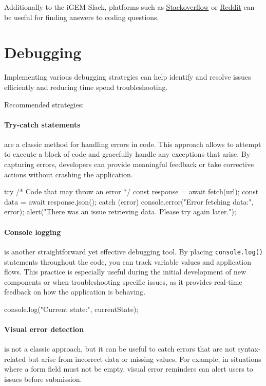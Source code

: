 
Additionally to the iGEM Slack, platforms such as \href{https://stackoverflow.com/}{Stackoverflow} or \href{https://www.reddit.com/}{Reddit} can be useful for finding answers to coding questions.


\section{Debugging}\label{sec:debugging}
Implementing various debugging strategies can help identify and resolve issues efficiently and reducing time spend
troubleshooting.

Recommended strategies:

\paragraph{Try-catch statements} are a classic method for handling errors in code.
This approach allows to attempt to execute a block of code and gracefully handle any exceptions that arise.
By capturing errors, developers can provide meaningful feedback or take corrective actions without crashing the application.
\begin{mytsbox}
    try {
            {/* Code that may throw an error */}
        const response = await fetch(url);
        const data = await response.json();
    } catch (error) {
        console.error("Error fetching data:", error);
        alert("There was an issue retrieving data.
        Please try again later.");
    }
\end{mytsbox}

\paragraph{Console logging} is another straightforward yet effective debugging tool.
By placing \texttt{console.log()} statements throughout the code, you can track variable values and
application flows.
This practice is especially useful during the initial development of new components or when troubleshooting
specific issues, as it provides real-time feedback on how the application is behaving.
\begin{mytsbox}
    console.log("Current state:", currentState);
\end{mytsbox}

\paragraph{Visual error detection} is not a classic approach, but it can be useful to catch errors that are not
syntax-related but arise from incorrect data or missing values.
For example, in situations where a form field must not be empty, visual error reminders can alert users to issues before submission. %

